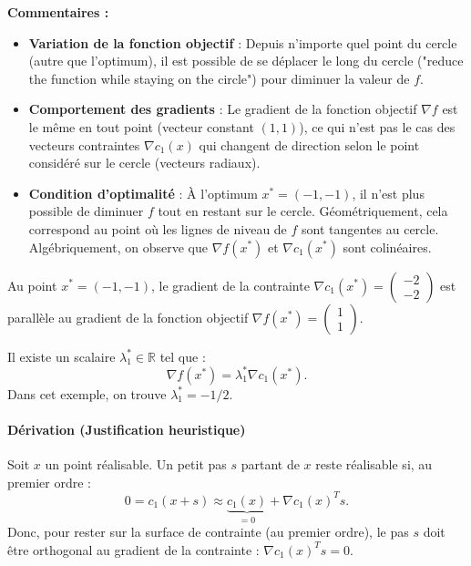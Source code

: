 \begin{figureexplanation}
\textbf{Commentaires :}
\begin{itemize}
    \item \textbf{Variation de la fonction objectif} : Depuis n'importe quel point du cercle (autre que l'optimum), il est possible de se déplacer le long du cercle ("reduce the function while staying on the circle") pour diminuer la valeur de $f$.
    \item \textbf{Comportement des gradients} : Le gradient de la fonction objectif $\nabla f$ est le même en tout point (vecteur constant $(1,1)$), ce qui n'est pas le cas des vecteurs contraintes $\nabla c_1(x)$ qui changent de direction selon le point considéré sur le cercle (vecteurs radiaux).
    \item \textbf{Condition d'optimalité} : À l'optimum $x^*=(-1,-1)$, il n'est plus possible de diminuer $f$ tout en restant sur le cercle. Géométriquement, cela correspond au point où les lignes de niveau de $f$ sont tangentes au cercle. Algébriquement, on observe que $\nabla f(x^*)$ et $\nabla c_1(x^*)$ sont colinéaires.
\end{itemize}
\end{figureexplanation}

\begin{remarque}
Au point $x^* = (-1, -1)$, le gradient de la contrainte $\nabla c_1(x^*) = \begin{pmatrix} -2 \\ -2 \end{pmatrix}$ est parallèle au gradient de la fonction objectif $\nabla f(x^*) = \begin{pmatrix} 1 \\ 1 \end{pmatrix}$.

Il existe un scalaire $\lambda_1^* \in \mathbb{R}$ tel que :
\begin{equation}
    \nabla f(x^*) = \lambda_1^* \nabla c_1(x^*).
\end{equation}
Dans cet exemple, on trouve $\lambda_1^* = -1/2$.
\end{remarque}

\paragraph{Dérivation (Justification heuristique)}
Soit $x$ un point réalisable. Un petit pas $s$ partant de $x$ reste réalisable si, au premier ordre :
\begin{equation}
    0 = c_1(x+s) \approx \underbrace{c_1(x)}_{=0} + \nabla c_1(x)^T s.
\end{equation}
Donc, pour rester sur la surface de contrainte (au premier ordre), le pas $s$ doit être orthogonal au gradient de la contrainte : $\nabla c_1(x)^T s = 0$.

